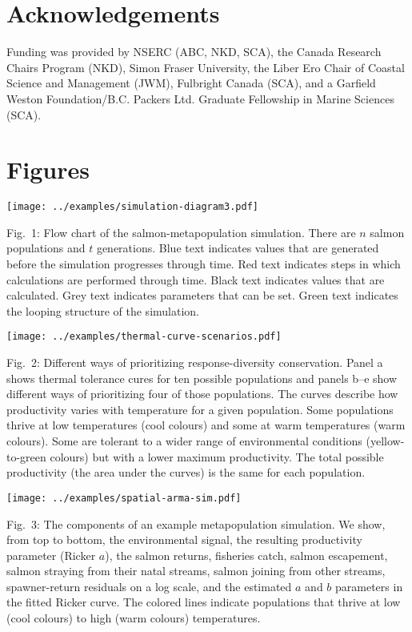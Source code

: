 \section{Acknowledgements}

Funding was provided by NSERC (ABC, NKD, SCA), the Canada Research Chairs Program (NKD), Simon Fraser University, the Liber Ero Chair of Coastal Science and Management (JWM), Fulbright Canada (SCA), and a Garfield Weston Foundation/B.C. Packers Ltd. Graduate Fellowship in Marine Sciences (SCA).





\clearpage

\section{Figures}

\setlength{\parskip}{6pt} \setlength{\parindent}{0cm} \texttt{[image: ../examples/simulation-diagram3.pdf]}

Fig.~1: Flow chart of the salmon-metapopulation simulation. There are $n$ salmon populations and $t$ generations. Blue text indicates values that are generated before the simulation progresses through time. Red text indicates steps in which calculations are performed through time. Black text indicates values that are calculated. Grey text indicates parameters that can be set. Green text indicates the looping structure of the simulation.

\clearpage
\texttt{[image: ../examples/thermal-curve-scenarios.pdf]}

Fig.~2: Different ways of prioritizing response-diversity conservation. Panel a shows thermal tolerance cures for ten possible populations and panels b--e show different ways of prioritizing four of those populations. The curves describe how productivity varies with temperature for a given population. Some populations thrive at low temperatures (cool colours) and some at warm temperatures (warm colours). Some are tolerant to a wider range of environmental conditions (yellow-to-green colours) but with a lower maximum productivity. The total possible productivity (the area under the curves) is the same for each population.

\clearpage
\texttt{[image: ../examples/spatial-arma-sim.pdf]}

Fig.~3: The components of an example metapopulation simulation. We show, from top to bottom, the environmental signal, the resulting productivity parameter (Ricker $a$), the salmon returns, fisheries catch, salmon escapement, salmon straying from their natal streams, salmon joining from other streams, spawner-return residuals on a log scale, and the estimated $a$ and $b$ parameters in the fitted Ricker curve. The colored lines indicate populations that thrive at low (cool colours) to high (warm colours) temperatures.

